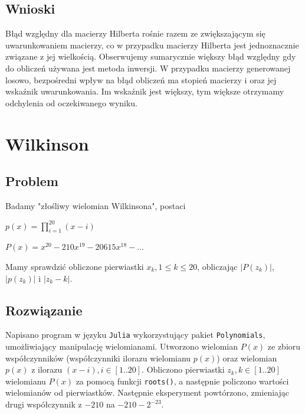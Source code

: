 \documentclass{article}
\begin{document}
        \subsection{Wnioski}
            Błąd względny dla macierzy Hilberta rośnie razem ze zwiększającym się uwarunkowaniem macierzy, co w przypadku macierzy Hilberta jest jednoznacznie związane z jej wielkością. Obserwujemy sumarycznie większy błąd względny gdy do obliczeń używana jest metoda inwersji. W przypadku macierzy generowanej losowo, bezpośredni wpływ na błąd obliczeń ma stopień macierzy i oraz jej wskaźnik uwarunkowania. Im wskaźnik jest większy, tym większe otrzymamy odchylenia od oczekiwanego wyniku.
            
    \section{Wilkinson}
        \subsection{Problem}
            Badamy "złośliwy wielomian Wilkinsona", postaci
            \begin{center}
                $p(x) = \prod_{i=1}^{20}(x - i)$ \\
                
            \end{center}
            \begin{center}
                $P(x) = x^{20} - 210x^{19} - 20615x^{18} - ...$    
            \end{center}
            Mamy sprawdzić obliczone pierwiastki $x_k, 1\leq k \leq 20$, obliczając $|P(z_k)|$, $|p(z_k)|$ i $|z_k - k|$.
        \subsection{Rozwiązanie}
            Napisano program w języku \texttt{Julia} wykorzystujący pakiet \texttt{Polynomials}, umożliwiający manipulację wielomianami. Utworzono wielomian $P(x)$ ze zbioru współczynników (współczynniki ilorazu wielomianu $p(x)$) oraz wielomian $p(x)$ z ilorazu $(x - i), i \in [1..20]$.
            Obliczono pierwiastki $z_k, k \in [1..20]$ wielomianu $P(x)$ za pomocą funkcji \texttt{roots()}, a następnie policzono wartości wielomianów od pierwiastków. Następnie eksperyment powtórzono, zmieniając drugi współczynnik z $-210$ na $-210-2^{-23}$.
\end{document}
